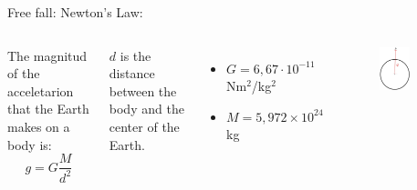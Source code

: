 \documentclass[]{beamer}
\begin{document}
\begin{frame}
    Free fall:
    \vspace{3mm}
Newton's Law:
\vspace{3mm}





  \begin{columns}[c]
    \column{2in}  %
   
    The magnitud of the acceletarion that the Earth makes on a body is:
    \begin{equation*}
        g=G\frac{M}{d^2}
    \end{equation*}
    
    $d$ is the distance between the body and the center of the Earth.
    \vspace{2mm}

    \begin{itemize}
        \item $G= 6,67·10^{-11} $ Nm$^{2}$/kg$^{2}$
        \pause

        \item $M=5,972 \times 10^{24}$ kg
    \end{itemize}
    
 
    \column{2.5in}
    
    \begin{figure}[h!]  
        \includegraphics[width=0.6\textwidth]{images/5.jpg}
       
      \end{figure}
 
 
 
    \end{columns}

\end{frame}  
\end{document}

